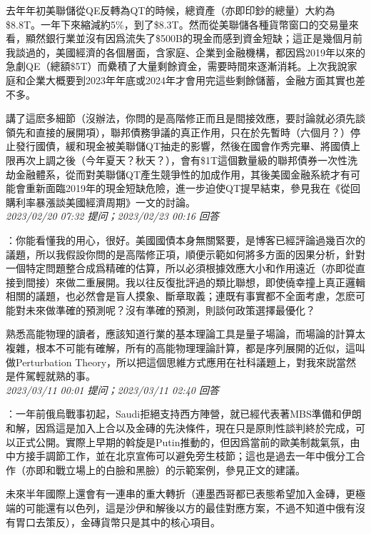 \documentclass[twocolumn]{ctexart}
\begin{document}
去年年初美聯儲從QE反轉為QT的時候，總資產（亦即印鈔的總量）大約為\$8.8T。一年下來縮減約5\%，到了\$8.3T。然而從美聯儲各種貨幣窗口的交易量來看，顯然銀行業並沒有因爲流失了\$500B的現金而感到資金短缺；這正是幾個月前我談過的，美國經濟的各個層面，含家庭、企業到金融機構，都因爲2019年以來的急劇QE（總額\$5T）而纍積了大量剩餘資金，需要時間來逐漸消耗。上次我說家庭和企業大概要到2023年年底或2024年才會用完這些剩餘儲蓄，金融方面其實也差不多。

講了這麽多細節（沒辦法，你問的是高階修正而且是間接效應，要討論就必須先談領先和直接的展開項），聯邦債務爭議的真正作用，只在於先暫時（六個月？）停止發行國債，緩和現金被美聯儲QT抽走的影響，然後在國會作秀完畢、將國債上限再次上調之後（今年夏天？秋天？），會有\$1T這個數量級的聯邦債券一次性洗劫金融體系，從而對美聯儲QT產生競爭性的加成作用，其後美國金融系統才有可能會重新面臨2019年的現金短缺危險，進一步迫使QT提早結束，參見我在《從回購利率暴漲談美國經濟周期》一文的討論。
\\

\textit{\hfill\noindent\small 2023/02/20 07:32 提问；2023/02/23 00:16 回答}

：你能看懂我的用心，很好。美國國債本身無關緊要，是博客已經評論過幾百次的議題，所以我假設你問的是高階修正項，順便示範如何將多方面的因果分析，針對一個特定問題整合成爲精確的估算，所以必須根據效應大小和作用遠近（亦即從直接到間接）來做二重展開。我以往反復批評過的類比聯想，即使僥幸撞上真正邏輯相關的議題，也必然會是盲人摸象、斷章取義；連既有事實都不全面考慮，怎麽可能對未來做準確的預測呢？沒有準確的預測，則談何政策選擇最優化？

熟悉高能物理的讀者，應該知道行業的基本理論工具是量子場論，而場論的計算太複雜，根本不可能有確解，所有的高能物理理論計算，都是序列展開的近似，這叫做Perturbation Theory，所以把這個思維方式應用在社科議題上，對我來説當然是件駕輕就熟的事。
\\

\textit{\hfill\noindent\small 2023/03/11 00:01 提问；2023/03/11 02:40 回答}

：一年前俄烏戰事初起，Saudi拒絕支持西方陣營，就已經代表著MBS準備和伊朗和解，因爲這是加入上合以及金磚的先決條件，現在只是原則性談判終於完成，可以正式公開。實際上早期的斡旋是Putin推動的，但因爲當前的歐美制裁氣氛，由中方接手調節工作，並在北京宣佈可以避免旁生枝節；這也是過去一年中俄分工合作（亦即和戰立場上的白臉和黑臉）的示範案例，參見正文的建議。

未來半年國際上還會有一連串的重大轉折（連墨西哥都已表態希望加入金磚，更極端的可能還有以色列，這是沙伊和解後以方的最佳對應方案，不過不知道中俄有沒有胃口去策反），金磚貨幣只是其中的核心項目。
\\
\end{document}
